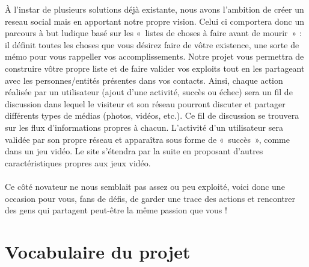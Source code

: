 \documentclass{life-fr}
\begin{document}
À l'instar de plusieurs solutions déjà existante, nous avons l'ambition de créer un reseau social mais en apportant notre propre vision.
Celui ci comportera donc un parcours à but ludique basé sur les «~listes de choses à faire avant de mourir~» : il définit toutes les choses que vous désirez faire de vôtre existence, une sorte de mémo pour vous rappeller vos accomplissements. Notre projet vous permettra de construire vôtre propre liste et de faire valider vos exploits tout en les partageant avec les personnes/entités présentes dans vos contacts. Ainsi, chaque action réalisée par un utilisateur (ajout d'une activité, succès ou échec) sera un fil de discussion dans lequel le visiteur et son réseau pourront discuter et partager différents types de médias (photos, vidéos, etc.). Ce fil de discussion se trouvera sur les flux d'informations propres à chacun. L'activité d'un utilisateur sera validée par son propre réseau et apparaîtra sous forme de «~succès~», comme dans un jeu vidéo. Le site s'étendra par la suite en proposant d'autres caractéristiques propres aux jeux vidéo.\\
\\
Ce côté novateur ne nous semblait pas assez ou peu exploité, voici donc une occasion pour vous, fans de défis, de garder une trace des actions et rencontrer des gens qui partagent peut-être la même passion que vous !


\section{Vocabulaire du projet}
\end{document}
